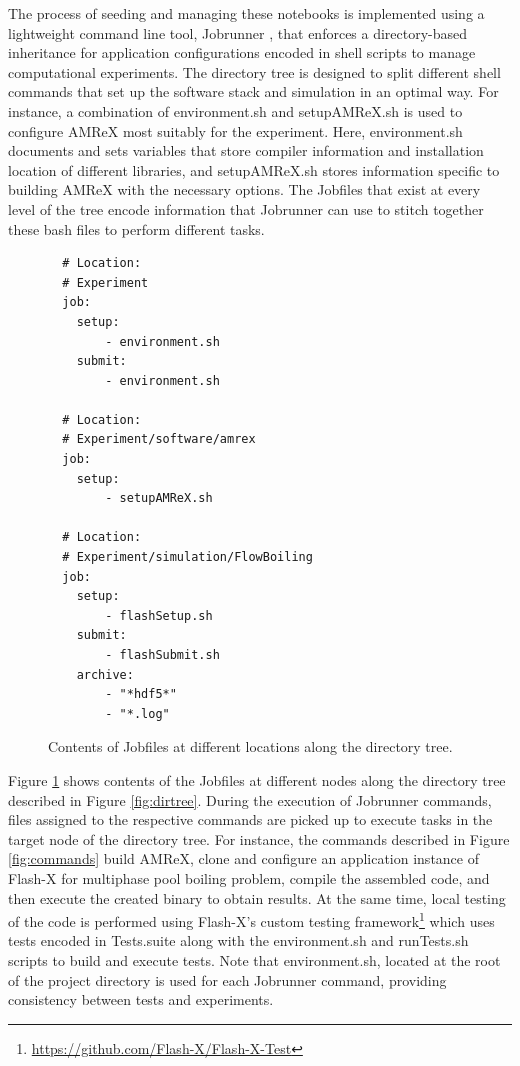 \documentclass{IEEEcsmag}
\begin{document}
The process of seeding and managing these notebooks is implemented using a lightweight command line tool, Jobrunner \cite{Jobrunner}, that enforces a directory-based inheritance for application configurations encoded in shell scripts to manage computational experiments. The directory tree is designed to split different shell commands that set up the software stack and simulation in an optimal way. For instance, a combination of {environment.sh} and {setupAMReX.sh} is used to configure AMReX most suitably for the experiment. Here, {environment.sh} documents and sets variables that store compiler information and installation location of different libraries, and {setupAMReX.sh} stores information specific to building AMReX with the necessary options. { The {Jobfiles} that exist at every level of the tree encode information that Jobrunner can use to stitch together these bash files to perform different tasks.} 
%
\begin{figure}
\begin{verbatim}
  # Location:
  # Experiment
  job:
    setup:
        - environment.sh
    submit:
        - environment.sh

  # Location:
  # Experiment/software/amrex
  job:
    setup:
        - setupAMReX.sh

  # Location: 
  # Experiment/simulation/FlowBoiling
  job:
    setup:
        - flashSetup.sh
    submit:
        - flashSubmit.sh
    archive:
        - "*hdf5*"
        - "*.log"
\end{verbatim}
\caption{Contents of {Jobfiles} at different locations along the directory tree.}
\label{fig:jobfiles}
\end{figure}

Figure \ref{fig:jobfiles} shows contents of the {Jobfiles} at different nodes along the directory tree described in Figure \ref{fig:dirtree}. During the execution of Jobrunner commands, files assigned to the respective commands are picked up to execute tasks in the target node of the directory tree. For instance, the commands described in Figure \ref{fig:commands} build AMReX, clone and configure an application instance of Flash-X for multiphase pool boiling problem, compile the assembled code, and then execute the created binary to obtain results. At the same time, local testing of the code is performed using Flash-X's custom testing framework\footnote{\url{https://github.com/Flash-X/Flash-X-Test}} which uses tests encoded in {Tests.suite} along with the {environment.sh} and {runTests.sh} scripts to build and execute tests. Note that environment.sh, located at the root of the project directory is used for each Jobrunner command, providing consistency between tests and experiments. 
\end{document}
